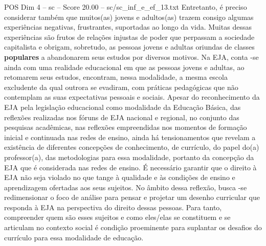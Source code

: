 \begin{textsample}{POS Dim 4 – sc – Score 20.00 – sc/sc\_inf\_e\_ef\_13.txt}
Entretanto, é preciso considerar também que muitos(as) jovens e adultos(as) trazem consigo algumas experiências negativas, frustrantes, suportadas ao longo da vida.
Muitas dessas experiências são frutos de relações injustas de poder que perpassam a sociedade capitalista e obrigam, sobretudo, as pessoas jovens e adultas oriundas de classes \textbf{populares} a abandonarem seus estudos por diversos motivos.
Na EJA, conta -se ainda com uma realidade educacional em que as pessoas jovens e adultas, ao retomarem seus estudos, encontram, nessa modalidade, a mesma escola excludente da qual outrora se evadiram, com práticas pedagógicas que não contemplam as suas expectativas pessoais e sociais.
Apesar do reconhecimento da EJA pela legislação educacional como modalidade da Educação Básica, das reflexões realizadas nos fóruns de EJA nacional e regional, no conjunto das pesquisas acadêmicas, nas reflexões empreendidas nos momentos de formação inicial e continuada nas redes de ensino, ainda há tensionamentos que revelam a existência de diferentes concepções de conhecimento, de currículo, do papel do(a) professor(a), das metodologias para essa modalidade, portanto da concepção da EJA que é considerada nas redes de ensino.
É necessário garantir que o direito à EJA não seja violado no que tange à qualidade e às condições de ensino e aprendizagem ofertadas aos seus sujeitos.
No âmbito dessa reflexão, busca -se redimensionar o foco de análise para pensar e projetar um desenho curricular que responda à EJA na perspectiva do direito dessas pessoas.
Para tanto, compreender quem são esses sujeitos e como eles/elas se constituem e se articulam no contexto social é condição proeminente para suplantar os desafios do currículo para essa modalidade de educação.

\end{textsample}
